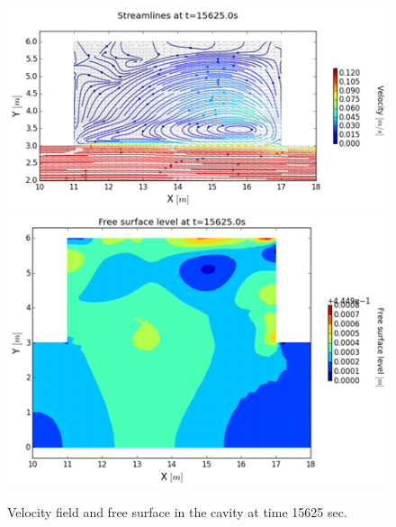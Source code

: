 \begin{figure}
 \centering
 \includegraphics{img/image139}
 \includegraphics{img/image140}
 \caption{Velocity field and free surface in the cavity at time 15625 sec.}\label{fig:cavity:vel_prof}
\end{figure}

